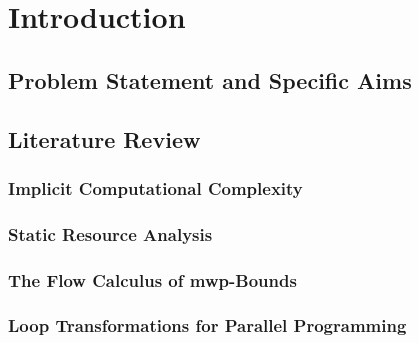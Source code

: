 \keepXColumns %

\dedication{}

\begin{abstract}\end{abstract}

\mainmatter
\pagestyle{plain}

\chapter{Introduction}\label{introduction}

    \section{Problem Statement and Specific Aims}
    \label{intro}
    

    \section{Literature Review}
    \label{sec:pre}
    

    \subsection{Implicit Computational Complexity}
    \label{icc}
    

    \subsection{Static Resource Analysis}
    \label{static-analysis}
    

    \subsection{The Flow Calculus of mwp-Bounds}
    \label{flow-calculus}
    

    \subsection{Loop Transformations for Parallel Programming}
    \label{transforms}
    

